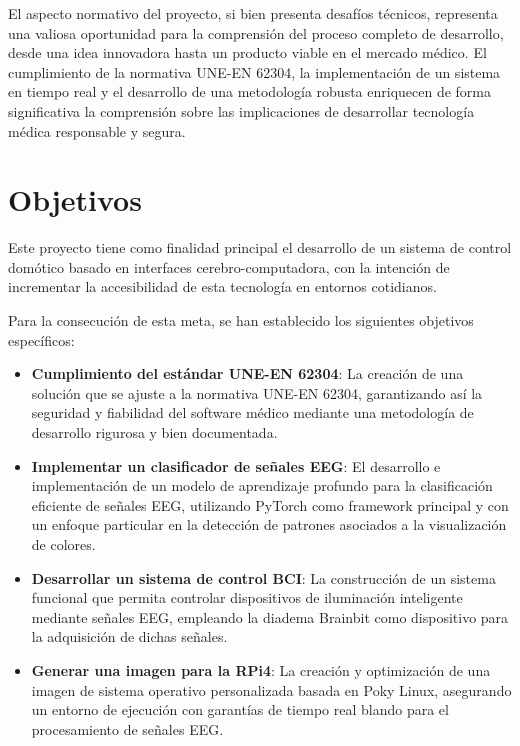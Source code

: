 El aspecto normativo del proyecto, si bien presenta desafíos técnicos, representa una valiosa oportunidad para la comprensión del proceso completo de desarrollo, desde una idea innovadora hasta un producto viable en el mercado médico. El cumplimiento de la normativa UNE-EN 62304, la implementación de un sistema en tiempo real y el desarrollo de una metodología robusta enriquecen de forma significativa la comprensión sobre las implicaciones de desarrollar tecnología médica responsable y segura.

\section{Objetivos}
Este proyecto tiene como finalidad principal el desarrollo de un sistema de control domótico basado en interfaces cerebro-computadora, con la intención de incrementar la accesibilidad de esta tecnología en entornos cotidianos.

Para la consecución de esta meta, se han establecido los siguientes objetivos específicos:

\begin{itemize}
    \item \textbf{Cumplimiento del estándar UNE-EN 62304}: La creación de una solución que se ajuste a la normativa UNE-EN 62304, garantizando así la seguridad y fiabilidad del software médico mediante una metodología de desarrollo rigurosa y bien documentada.
    
    \item \textbf{Implementar un clasificador de señales EEG}: El desarrollo e implementación de un modelo de aprendizaje profundo para la clasificación eficiente de señales EEG, utilizando PyTorch como framework principal y con un enfoque particular en la detección de patrones asociados a la visualización de colores.
    
    \item \textbf{Desarrollar un sistema de control BCI}: La construcción de un sistema funcional que permita controlar dispositivos de iluminación inteligente mediante señales EEG, empleando la diadema Brainbit como dispositivo para la adquisición de dichas señales.
    
    \item \textbf{Generar una imagen para la RPi4}: La creación y optimización de una imagen de sistema operativo personalizada basada en Poky Linux, asegurando un entorno de ejecución con garantías de tiempo real blando para el procesamiento de señales EEG.
\end{itemize}

